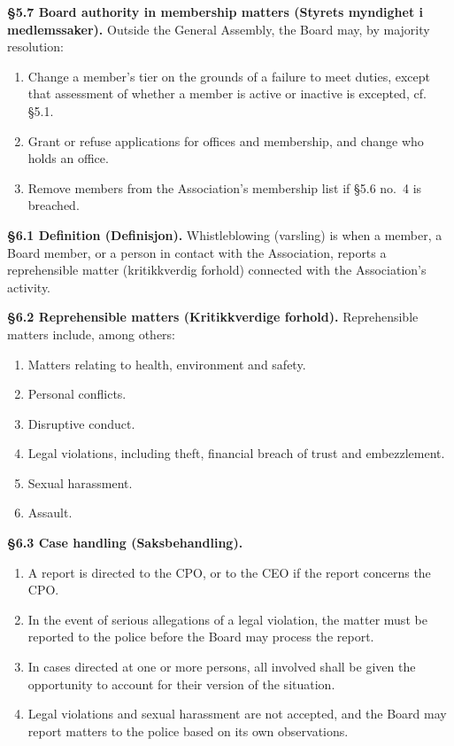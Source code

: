 \documentclass{../../../Common/Latex/Templates/rapport}
\begin{document}
\textbf{\S 5.7 Board authority in membership matters (Styrets myndighet i medlemssaker).} Outside the General Assembly, the Board may, by majority resolution:
\begin{enumerate}
  \item Change a member's tier on the grounds of a failure to meet duties, except that assessment of whether a member is active or inactive is excepted, cf. \S5.1.
  \item Grant or refuse applications for offices and membership, and change who holds an office.
  \item Remove members from the Association's membership list if \S5.6 no.\ 4 is breached.
\end{enumerate}

\textbf{\S 6.1 Definition (Definisjon).} Whistleblowing (varsling) is when a member, a Board member, or a person in contact with the Association, reports a reprehensible matter (kritikkverdig forhold) connected with the Association's activity.

\textbf{\S 6.2 Reprehensible matters (Kritikkverdige forhold).} Reprehensible matters include, among others:
\begin{enumerate}
  \item Matters relating to health, environment and safety.
  \item Personal conflicts.
  \item Disruptive conduct.
  \item Legal violations, including theft, financial breach of trust and embezzlement.
  \item Sexual harassment.
  \item Assault.
\end{enumerate}

\textbf{\S 6.3 Case handling (Saksbehandling).}
\begin{enumerate}
  \item A report is directed to the CPO, or to the CEO if the report concerns the CPO.
  \item In the event of serious allegations of a legal violation, the matter must be reported to the police before the Board may process the report.
  \item In cases directed at one or more persons, all involved shall be given the opportunity to account for their version of the situation.
  \item Legal violations and sexual harassment are not accepted, and the Board may report matters to the police based on its own observations.
\end{enumerate}
\end{document}
